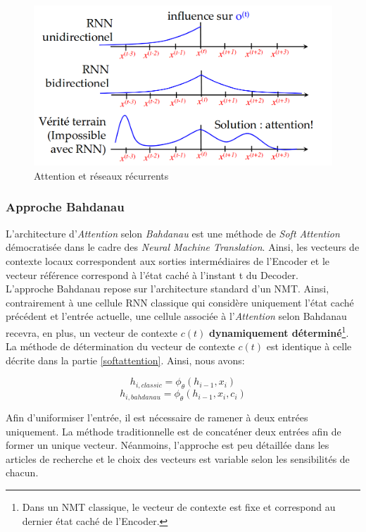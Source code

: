 \begin{figure}
    \centering
    \includegraphics[scale=0.3]{./tex/attention-deep-learning/attentionlstm.png}
    \caption{Attention et réseaux récurrents}
    \label{recatt}
\end{figure}

\subsubsection{Approche Bahdanau}

L'architecture d'\textit{Attention} selon \textit{Bahdanau}\cite{softbadha} est une méthode de \textit{Soft Attention} démocratisée dans le cadre des \textit{Neural Machine Translation}. Ainsi, les vecteurs de contexte locaux correspondent aux sorties intermédiaires de l'Encoder et le vecteur référence correspond à l'état caché à l'instant t du Decoder.\\

\noindent L'approche Bahdanau repose sur l'architecture standard d'un NMT. Ainsi, contrairement à une cellule RNN classique qui considère uniquement l'état caché précédent et l'entrée actuelle, une cellule associée à l'\textit{Attention} selon Bahdanau recevra, en plus, un vecteur de contexte $c(t)$ \textbf{dynamiquement déterminé}\footnote{Dans un NMT classique, le vecteur de contexte est fixe et correspond au dernier état caché de l'Encoder.}. La méthode de détermination du vecteur de contexte $c(t)$ est identique à celle décrite dans la partie \ref{softattention}. Ainsi, nous avons:

$$h_{i, classic}=\phi_\theta(h_{i-1}, x_i)$$
$$h_{i, bahdanau}=\phi_\theta(h_{i-1}, x_i, c_i)$$

\noindent Afin d'uniformiser l'entrée, il est nécessaire de ramener à deux entrées uniquement. La méthode traditionnelle est de concaténer deux entrées afin de former un unique vecteur. Néanmoins, l'approche est peu détaillée dans les articles de recherche et le choix des vecteurs est variable selon les sensibilités de chacun.\\

